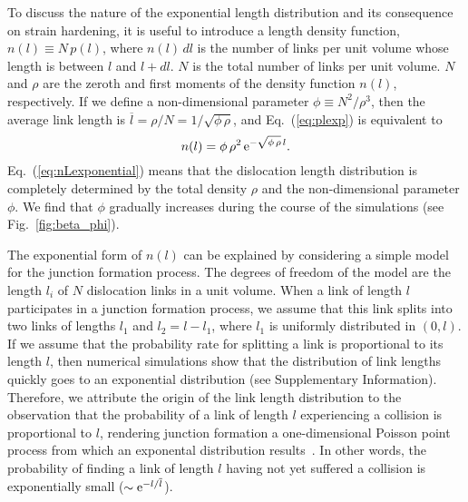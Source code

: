 \documentclass[%
reprint,
 amsmath,amssymb,
 aps,
superscriptaddress,
]{revtex4-1}
\begin{document}
To discuss the nature of the exponential length distribution and its consequence
on strain hardening, it is useful to introduce a length density function, $n(l)
\equiv N\,p(l)$, where $n(l)\,dl$ is the number of links per unit
volume whose length is between $l$ and $l+dl$.
%
$N$ is the total number of links per unit volume.
%
$N$ and $\rho$ are the zeroth and first moments of the density function $n(l)$,
respectively.  
%
If we define a non-dimensional parameter $\phi \equiv N^2 / \rho^3$, then the
average link length is $\overline{l} = \rho / N = 1 / \sqrt{\phi\,\rho}$, and 
%
Eq.~(\ref{eq:plexp}) is equivalent to
%
\begin{equation}
   n(l) = \phi\, \rho^2 \, {\rm e}^{ -\sqrt{\phi\,\rho}\, l}.  \label{eq:nLexponential}
\end{equation}
%
Eq.~(\ref{eq:nLexponential}) means that the dislocation length distribution is
completely determined by the total density $\rho$ and the non-dimensional
parameter $\phi$. 
%
We find that $\phi$ gradually increases during the course of the simulations (see 
Fig.~\ref{fig:beta_phi}).
%



The exponential form of $n(l)$ can be explained by considering a simple model 
for the junction formation process.
%
The degrees of freedom of the model are the length $l_i$ of $N$ dislocation links in a unit 
volume.
%
When a link of length $l$ participates in a junction formation
process, we assume that this link splits into two links of lengths $l_1$ and
$l_2 = l - l_1$, where $l_1$ is uniformly distributed in $(0,l)$.
%
If we assume that the probability rate for splitting a link is proportional to
its length $l$, then numerical simulations show that the distribution of
link lengths quickly goes to an exponential distribution (see Supplementary
Information).
%
Therefore, we attribute the origin of the link length distribution to the
observation that the probability of a link of length $l$ experiencing a
collision is proportional to $l$, rendering junction formation a one-dimensional
Poisson point process from which an exponental distribution
results~\cite{Lanchier2017B}.
%
In other words, the probability of finding a link of length $l$ having not yet 
suffered a collision is exponentially small ($\sim {\rm
e}^{-l/\overline{l}}$).
\end{document}
